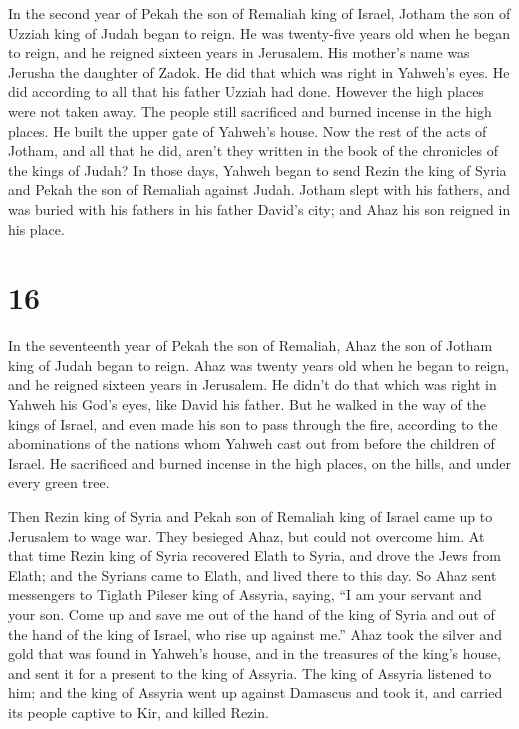  In the second year of Pekah the son of Remaliah king of
Israel, Jotham the son of Uzziah king of Judah began to reign.
 He was twenty-five years old when he began to reign, and
he reigned sixteen years in Jerusalem. His mother's name was Jerusha the
daughter of Zadok.  He did that which was right in Yahweh's
eyes. He did according to all that his father Uzziah had done.
 However the high places were not taken away. The people
still sacrificed and burned incense in the high places. He built the
upper gate of Yahweh's house.  Now the rest of the acts of
Jotham, and all that he did, aren't they written in the book of the
chronicles of the kings of Judah?  In those days, Yahweh
began to send Rezin the king of Syria and Pekah the son of Remaliah
against Judah.  Jotham slept with his fathers, and was
buried with his fathers in his father David's city; and Ahaz his son
reigned in his place.

\hypertarget{section-15}{%
\section{16}\label{section-15}}

 In the seventeenth year of Pekah the son of Remaliah, Ahaz
the son of Jotham king of Judah began to reign.  Ahaz was
twenty years old when he began to reign, and he reigned sixteen years in
Jerusalem. He didn't do that which was right in Yahweh his God's eyes,
like David his father.  But he walked in the way of the
kings of Israel, and even made his son to pass through the fire,
according to the abominations of the nations whom Yahweh cast out from
before the children of Israel.  He sacrificed and burned
incense in the high places, on the hills, and under every green tree.

 Then Rezin king of Syria and Pekah son of Remaliah king of
Israel came up to Jerusalem to wage war. They besieged Ahaz, but could
not overcome him.  At that time Rezin king of Syria
recovered Elath to Syria, and drove the Jews from Elath; and the Syrians
came to Elath, and lived there to this day.  So Ahaz sent
messengers to Tiglath Pileser king of Assyria, saying, ``I am your
servant and your son. Come up and save me out of the hand of the king of
Syria and out of the hand of the king of Israel, who rise up against
me.''  Ahaz took the silver and gold that was found in
Yahweh's house, and in the treasures of the king's house, and sent it
for a present to the king of Assyria.  The king of Assyria
listened to him; and the king of Assyria went up against Damascus and
took it, and carried its people captive to Kir, and killed Rezin.

